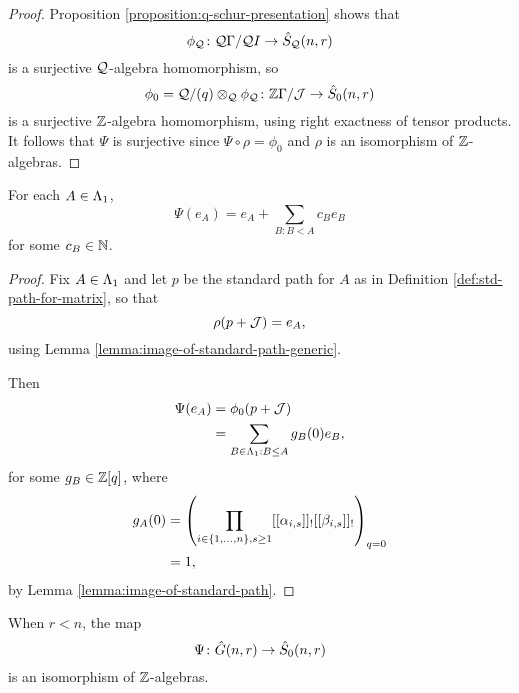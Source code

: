 \documentclass[a4paper, 11pt]{report}
\begin{document}
\begin{proof}
Proposition \ref{proposition:q-schur-presentation} shows that
\begin{equation*}
\phi_{\mathcal{Q}}\colon \mathcal{Q}\Gamma/{\mathcal{Q}I}\to\hat{S}_{\mathcal{Q}}(n,r)
\end{equation*}
is a surjective $\mathcal{Q}$-algebra homomorphism, so
\begin{equation*}
\phi_0 = \mathcal{Q}/{(q)}\otimes_{\mathcal{Q}}\phi_{\mathcal{Q}} \colon \mathbb{Z}\Gamma/{\mathcal{J}}\to\hat{S}_0(n,r)
\end{equation*}
is a surjective $\mathbb{Z}$-algebra homomorphism, using right exactness of tensor products. It follows that $\Psi$ is surjective since $\Psi\circ\rho=\phi_0$ and $\rho$ is an isomorphism of $\mathbb{Z}$-algebras.
\end{proof}

\begin{lemma}\label{lemma:transfer-map-leading-term}
For each $A\in\Lambda_1{}$,
\begin{equation*}
\Psi(e_A) = e_A +\sum_{B:B<A} c_B e_B
\end{equation*}
for some $c_B\in\mathbb{N}$.
\end{lemma}

\begin{proof}
Fix $A\in\Lambda_1{}$ and let $p$ be the standard path for $A$ as in Definition \ref{def:std-path-for-matrix}, so that
\begin{equation*}
\rho(p+\mathcal{J})=e_A,
\end{equation*}
using Lemma \ref{lemma:image-of-standard-path-generic}.

Then
\begin{align*}
\Psi(e_A)
&= \phi_0(p+\mathcal{J})\\
&= \sum_{B\in\Lambda_1{}:B\le A} g_B(0) e_B,
\end{align*}
for some $g_B\in\mathbb{Z}[q]$, where
\begin{align*}
g_A(0)
&= \left(\prod_{i\in\{1,\ldots,n\},s\geq 1} [[\alpha_{i,s}]]_![[\beta_{i,s}]]_!\right)_{q=0}\\
&= 1,
\end{align*}
by Lemma \ref{lemma:image-of-standard-path}.
\end{proof}

\begin{theorem}
When $r<n$, the map
\begin{equation*}
\Psi\colon\hat{G}(n,r)\to\hat{S}_0(n,r)
\end{equation*}
is an isomorphism of $\mathbb{Z}$-algebras.
\end{theorem}
\end{document}

